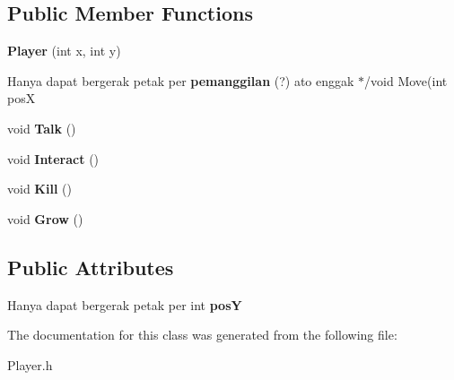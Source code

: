 \subsection*{Public Member Functions}
\begin{DoxyCompactItemize}
\item 
\mbox{\label{classPlayer_a9b009cc0bebdcc27a837d50b1f4ededd}} 
{\bfseries Player} (int x, int y)
\item 
\mbox{\label{classPlayer_a7397d7b5cde969d16d42fadfbbdf5ed6}} 
Hanya dapat bergerak petak per {\bfseries pemanggilan} (?) ato enggak $\ast$/void Move(int posX
\item 
\mbox{\label{classPlayer_aea0a70d3ccb250dffab89aadcf24da7d}} 
void {\bfseries Talk} ()
\item 
\mbox{\label{classPlayer_a8e37426c9e431828f67840b507b0d2ef}} 
void {\bfseries Interact} ()
\item 
\mbox{\label{classPlayer_a0c74d6bd430490417bb34e9abc233bb7}} 
void {\bfseries Kill} ()
\item 
\mbox{\label{classPlayer_a91c92058dc2edc2a2a954abb6806cf3a}} 
void {\bfseries Grow} ()
\end{DoxyCompactItemize}
\subsection*{Public Attributes}
\begin{DoxyCompactItemize}
\item 
\mbox{\label{classPlayer_a877e264962066a3d85e6a3bd5ea4a161}} 
Hanya dapat bergerak petak per int {\bfseries posY}
\end{DoxyCompactItemize}


The documentation for this class was generated from the following file\+:\begin{DoxyCompactItemize}
\item 
Player.\+h\end{DoxyCompactItemize}
